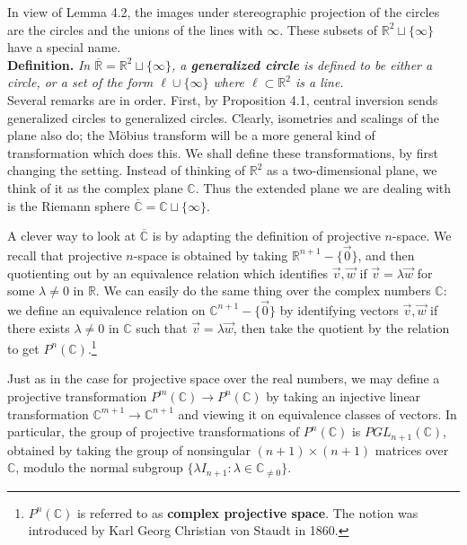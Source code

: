 \documentclass[leqno]{book}
\begin{document}
\noindent In view of Lemma 4.2, the images under stereographic projection of the circles are the circles and the unions of the lines with $\infty$.  These subsets of $\mathbb R^2\sqcup\{\infty\}$ have a special name.\\

\noindent\textbf{Definition.} \emph{In $\overline{\mathbb R}=\mathbb R^2\sqcup\{\infty\}$, a \textbf{generalized circle} is defined to be either a circle, or a set of the form $\ell\cup\{\infty\}$ where $\ell\subset\mathbb R^2$ is a line.}\\

\noindent Several remarks are in order.  First, by Proposition 4.1, central inversion sends generalized circles to generalized circles.  Clearly, isometries and scalings of the plane also do; the M\"obius transform will be a more general kind of transformation which does this.  We shall define these transformations, by first changing the setting.  Instead of thinking of $\mathbb R^2$ as a two-dimensional plane, we think of it as the complex plane $\mathbb C$.  Thus the extended plane we are dealing with is the Riemann sphere $\overline{\mathbb C}=\mathbb C\sqcup\{\infty\}$.

A clever way to look at $\overline{\mathbb C}$ is by adapting the definition of projective $n$-space.  We recall that projective $n$-space is obtained by taking $\mathbb R^{n+1}-\{\vec 0\}$, and then quotienting out by an equivalence relation which identifies $\vec v,\vec w$ if $\vec v=\lambda\vec w$ for some $\lambda\ne 0$ in $\mathbb R$.  We can easily do the same thing over the complex numbers $\mathbb C$: we define an equivalence relation on $\mathbb C^{n+1}-\{\vec 0\}$ by identifying vectors $\vec v,\vec w$ if there exists $\lambda\ne 0$ in $\mathbb C$ such that $\vec v=\lambda\vec w$, then take the quotient by the relation to get $P^n(\mathbb C)$.\footnote{$P^n(\mathbb C)$ is referred to as \textbf{complex projective space}.  The notion was introduced by Karl Georg Christian von Staudt in 1860.}

Just as in the case for projective space over the real numbers, we may define a projective transformation $P^m(\mathbb C)\to P^n(\mathbb C)$ by taking an injective linear transformation $\mathbb C^{m+1}\to\mathbb C^{n+1}$ and viewing it on equivalence classes of vectors.  In particular, the group of projective transformations of $P^n(\mathbb C)$ is $PGL_{n+1}(\mathbb C)$, obtained by taking the group of nonsingular $(n+1)\times(n+1)$ matrices over $\mathbb C$, modulo the normal subgroup $\{\lambda I_{n+1}:\lambda\in\mathbb C_{\ne 0}\}$.
\end{document}
